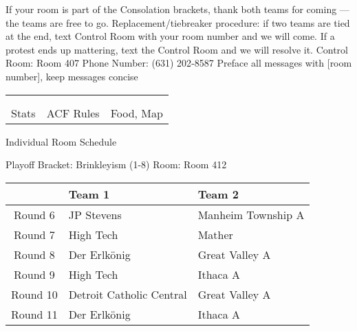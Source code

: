 \documentclass{article}%
\begin{document}
\newline%
If your room is part of the Consolation brackets, thank both teams for coming — the teams are free to go.\newline%
\newline%
Replacement/tiebreaker procedure: if two teams are tied at the end, text Control Room with your room number and we will come. If a protest ends up mattering, text the Control Room and we will resolve it.\newline%
\newline%
Control Room: Room 407\newline%
Phone Number: (631) 202{-}8587\newline%
Preface all messages with {[}room number{]}, keep messages concise%
\vspace*{30pt}%
\newline%
%
\begin{tabularx}{\textwidth}{YYY}%
  &  &  \\%
\\%
Stats&ACF Rules&Food, Map\\%
\end{tabularx}%
\newpage%
\begin{center}%
\begin{Huge}%
Individual Room Schedule%
\end{Huge}%
\vspace*{16pt}%
\linebreak%
\begin{Large}%
Playoff Bracket: Brinkleyism (1-8) \hfill Room: Room 412%
\end{Large}%
\end{center}%
%
\begin{tabularx}{\textwidth}{|c|Y|Y|}%
\hline%
&Team 1&Team 2\\%
\hline%
Round 6&JP Stevens&Manheim Township A\\%
Round 7&High Tech&Mather\\%
Round 8&Der Erlkönig&Great Valley A\\%
Round 9&High Tech&Ithaca A\\%
Round 10&Detroit Catholic Central&Great Valley A\\%
Round 11&Der Erlkönig&Ithaca A\\%
\hline%
\end{tabularx}%
\end{document}
